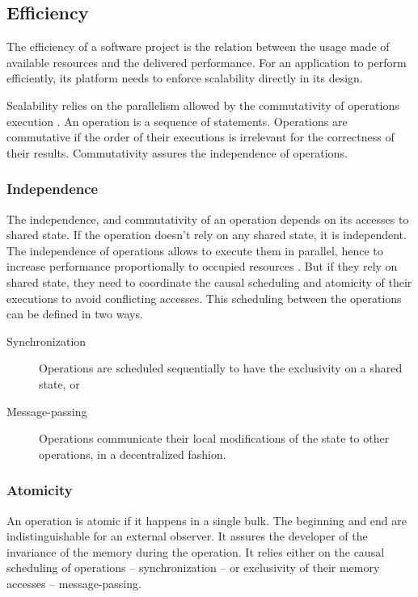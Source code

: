 \subsection{Efficiency} \label{chapter3:definitions:efficiency}

The efficiency of a software project is the relation between the usage made of available resources and the delivered performance.
For an application to perform efficiently, its platform needs to enforce scalability directly in its design.

Scalability relies on the parallelism allowed by the commutativity of operations execution \cite{Clements2013a}.
An operation is a sequence of statements.
Operations are commutative if the order of their executions is irrelevant for the correctness of their results.
Commutativity assures the independence of operations.

\subsubsection{Independence} \label{chapter3:definitions:efficiency:independence}

The independence, and commutativity of an operation depends on its accesses to shared state.
If the operation doesn't rely on any shared state, it is independent.
The independence of operations allows to execute them in parallel, hence to increase performance proportionally to occupied resources \cite{Amdahl1967,Gunther1993}.
But if they rely on shared state, they need to coordinate the causal scheduling and atomicity of their executions to avoid conflicting accesses.
This scheduling between the operations can be defined in two ways.
\begin{description}
\item[Synchronization] Operations are scheduled sequentially to have the exclusivity on a shared state, or
\item[Message-passing] Operations communicate their local modifications of the state to other operations, in a decentralized fashion.
\end{description}

\subsubsection{Atomicity} \label{chapter3:definitions:efficiency:atomicity}

An operation is atomic if it happens in a single bulk.
The beginning and end are indistinguishable for an external observer.
It assures the developer of the invariance of the memory during the operation.
It relies either on the causal scheduling of operations -- synchronization -- or exclusivity of their memory accesses -- message-passing.

